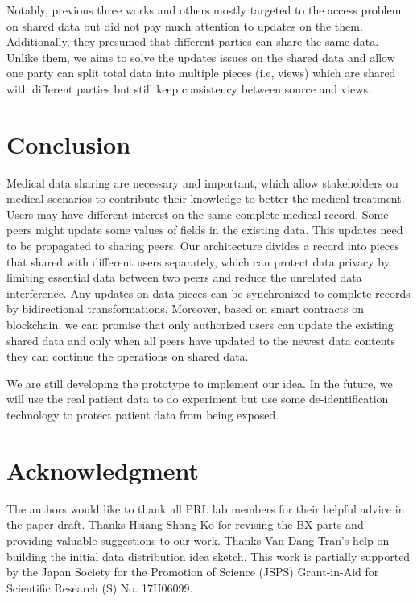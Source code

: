\documentclass[conference]{IEEEtran}
\begin{document}
Notably, previous three works and others \cite{liu2018bpds,xia2017bbds,amofa2018blockchain,dagher2018ancile,fan2018medblock} mostly targeted to the access problem on shared data but did not pay much attention to updates on the them. Additionally, they presumed that different parties can share the same data. Unlike them, we aims to solve the updates issues on the shared data and allow one party can split total data into multiple pieces (i.e, views) which are shared with different parties but still keep consistency between source and views.

\section{Conclusion}
\label{conclude}

Medical data sharing are necessary and important, which allow stakeholders on medical scenarios to contribute their knowledge to better the medical treatment. Users may have different interest on the same complete medical record. Some peers might update some values of fields in the existing data. This updates need to be propagated to sharing peers. Our architecture divides a record into pieces that shared with different users separately, which can protect data privacy by limiting essential data between two peers and reduce the unrelated data interference. Any updates on data pieces can be synchronized to complete records by bidirectional transformations. Moreover, based on smart contracts on blockchain, we can promise that only authorized users can update the existing shared data and only when all peers have updated to the newest data contents they can continue the operations on shared data.   

We are still developing the prototype to implement our idea.
In the future, we will use the real patient data to do experiment but use some de-identification technology to protect patient data from being exposed. 

\section*{Acknowledgment}
The authors would like to thank all PRL lab members for their helpful advice in the paper draft.  Thanks Hsiang-Shang Ko for revising the BX parts and providing valuable suggestions to our work. Thanks Van-Dang Tran's help on building the initial data distribution idea sketch. This work is partially supported by the Japan Society for the Promotion of Science (JSPS) Grant-in-Aid for Scientific Research (S) No. 17H06099.



\end{document}
